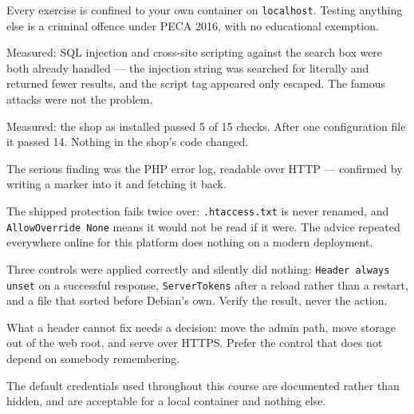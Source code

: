 \begin{chaptersummary}
\begin{tight}
  \item Every exercise is confined to your own container on \texttt{localhost}.
        Testing anything else is a criminal offence under PECA 2016, with no
        educational exemption.
  \item Measured: SQL injection and cross-site scripting against the search box
        were both already handled --- the injection string was searched for
        literally and returned fewer results, and the script tag appeared only
        escaped. The famous attacks were not the problem.
  \item Measured: the shop as installed passed 5 of 15 checks. After one
        configuration file it passed 14. Nothing in the shop's code changed.
  \item The serious finding was the PHP error log, readable over HTTP ---
        confirmed by writing a marker into it and fetching it back.
  \item The shipped protection fails twice over: \texttt{.htaccess.txt} is
        never renamed, and \texttt{AllowOverride None} means it would not be
        read if it were. The advice repeated everywhere online for this
        platform does nothing on a modern deployment.
  \item Three controls were applied correctly and silently did nothing:
        \texttt{Header always unset} on a successful response,
        \texttt{ServerTokens} after a reload rather than a restart, and a file
        that sorted before Debian's own. Verify the result, never the action.
  \item What a header cannot fix needs a decision: move the admin path, move
        storage out of the web root, and serve over HTTPS. Prefer the control
        that does not depend on somebody remembering.
  \item The default credentials used throughout this course are documented
        rather than hidden, and are acceptable for a local container and
        nothing else.
\end{tight}
\end{chaptersummary}

